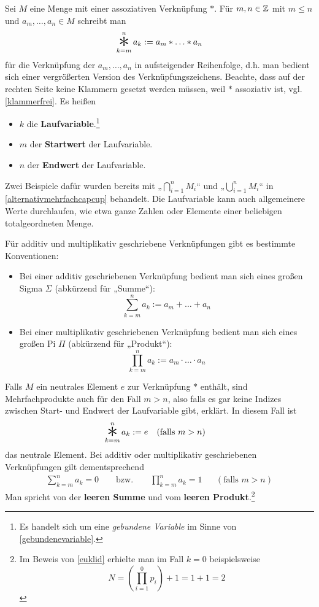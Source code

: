\begin{nota}[Mehrfachprodukte] \label{mehrfachprodukt}
    Sei $M$ eine Menge mit einer assoziativen Verknüpfung $*$. Für $m,n\in \mathbb Z$ mit $m\le n$ und $a_m,\dots , a_n\in M$ schreibt man
        \[ \mathop{\raisebox{-0.6ex}{\scalebox{2.5}{$*$}}}_{k=m}^n a_k := a_m * \ldots * a_n \]
    für die Verknüpfung der $a_m,\dots , a_n$ in aufsteigender Reihenfolge, d.h. man bedient sich einer vergrößerten Version des Verknüpfungszeichens. Beachte, dass auf der rechten Seite keine Klammern gesetzt werden müssen, weil $*$ assoziativ ist, vgl. \cref{klammerfrei}. Es heißen
    \begin{itemize}
        \item $k$ die \textbf{Laufvariable}.\footnote{Es handelt sich um eine \emph{gebundene Variable} im Sinne von \cref{gebundenevariable}.}
        \item $m$ der \textbf{Startwert} der Laufvariable.
        \item $n$ der \textbf{Endwert} der Laufvariable.
    \end{itemize}
    Zwei Beispiele dafür wurden bereits mit „$\bigcap_{i=1}^n M_i$“ und „$\bigcup_{i=1}^n M_i$“ in \cref{alternativmehrfachcapcup} behandelt. Die Laufvariable kann auch allgemeinere Werte durchlaufen, wie etwa ganze Zahlen oder Elemente einer beliebigen totalgeordneten Menge.
    
    Für additiv und multiplikativ geschriebene Verknüpfungen gibt es bestimmte Konventionen:
    \begin{itemize}
        \item Bei einer additiv geschriebenen Verknüpfung bedient man sich eines großen Sigma $\Sigma$ (abkürzend für „Summe“):
            \[ \sum_{k=m}^n a_k := a_m + \ldots + a_n \]
        \item Bei einer multiplikativ geschriebenen Verknüpfung bedient man sich eines großen Pi $\Pi$ (abkürzend für „Produkt“):
            \[ \prod_{k=m}^n a_k := a_m \cdot \ldots \cdot a_n \]
    \end{itemize}
    Falls $M$ ein neutrales Element $e$ zur Verknüpfung $*$ enthält, sind Mehrfachprodukte auch für den Fall $m>n$, also falls es gar keine Indizes zwischen Start- und Endwert der Laufvariable gibt, erklärt. In diesem Fall ist
    \begin{align*}
        \mathop{\raisebox{-0.6ex}{\scalebox{2.5}{$*$}}}_{k=m}^n a_k & := e && (\text{falls $m>n$})
    \end{align*}
    das neutrale Element. Bei additiv oder multiplikativ geschriebenen Verknüpfungen gilt dementsprechend
    \begin{align*}
        \sum_{k=m}^n a_k = 0 \qquad\text{bzw.}\qquad \prod_{k=m}^n a_k = 1 && (\text{falls $m>n$})
    \end{align*}
    Man spricht von der \textbf{leeren Summe} und vom \textbf{leeren Produkt}.\footnote{Im Beweis von \cref{euklid} erhielte man im Fall $k=0$ beispielsweise \[ N = \left(\prod_{i=1}^0 p_i\right) + 1 = 1+1 = 2\]}
    

\end{nota}
